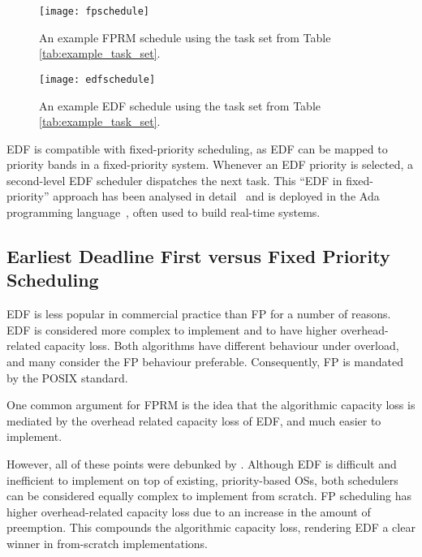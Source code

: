 \begin{figure}[t]
	\centering
    \texttt{[image: fpschedule]}
	\caption{An example FPRM schedule using the task set from Table \ref{tab:example_task_set}.}
    \label{f:fp-schedule}
\end{figure}
\begin{figure}[t]
	\centering	
	\texttt{[image: edfschedule]}
	\caption{An example EDF schedule using the task set from Table \ref{tab:example_task_set}.}
	\label{f:edf-schedule}
\end{figure}

\gls{EDF} is compatible with fixed-priority scheduling, as \gls{EDF} can be mapped to priority bands
in a fixed-priority system. Whenever an \gls{EDF} priority is selected, a second-level \gls{EDF}
scheduler dispatches the next task. This ``EDF in fixed-priority'' approach has been analysed in
detail~\citep{Harbour_Palencia_03} and is deployed in the Ada programming
language~\citep{Burns_Wellings:crtpa}, often used to build real-time systems.

\subsection{Earliest Deadline First versus Fixed Priority Scheduling}
\label{s:overload}

\gls{EDF} is less popular in commercial practice than \gls{FP} for a number of reasons.  \gls{EDF}
is considered more complex to implement and to have higher overhead-related capacity loss.
Both algorithms have different behaviour under overload, and many consider the \gls{FP} behaviour
preferable.  Consequently, \gls{FP}
is mandated by the POSIX standard.

One common argument for
\gls{FPRM} is the idea that the algorithmic capacity loss is mediated by the overhead related
capacity loss of \gls{EDF}, and much easier to implement. 

However, all of these points were debunked by \citet{Buttazzo_05}.  Although \gls{EDF} is difficult
and inefficient to implement on top of existing, priority-based \glspl{OS}, both schedulers
can be considered equally complex to implement from scratch.  \gls{FP} scheduling has higher
overhead-related capacity loss due to an increase in the amount of preemption.  This compounds the
algorithmic capacity loss, rendering \gls{EDF} a clear winner in from-scratch implementations.

